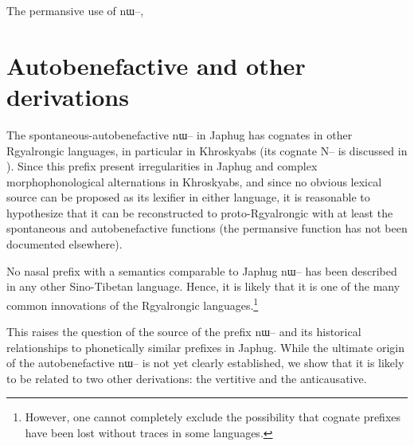 \documentclass[oldfontcommands,oneside,a4paper,11pt]{article}
\newcommand{\ipa}[1]{{\phon \mbox{#1}}} %
\begin{document}
%

The permansive use of \ipa{nɯ--}, 





\section{Autobenefactive and other derivations}

The spontaneous-autobenefactive \ipa{nɯ--} in Japhug has cognates in other Rgyalrongic languages, in particular in Khroskyabs (its cognate \ipa{N--} is discussed in \citealt[157-160]{lai13affixale}). Since this prefix present irregularities in Japhug and complex morphophonological alternations in Khroskyabs, and since no obvious lexical source can be proposed as its lexifier in either language, it is reasonable to hypothesize that it can be reconstructed to proto-Rgyalrongic with at least the spontaneous and autobenefactive functions (the permansive function has not been documented elsewhere).


No nasal prefix with a semantics comparable to Japhug \ipa{nɯ--} has been described in any other Sino-Tibetan language. Hence, it is likely that it is one of the many common innovations of the Rgyalrongic languages.\footnote{However, one cannot completely exclude the possibility that cognate prefixes have been lost without traces in some languages.} 

This raises the question of the source of the prefix \ipa{nɯ--} and its historical relationships to phonetically similar prefixes in Japhug. While the ultimate origin of the autobenefactive \ipa{nɯ--} is not yet clearly established, we show that it is likely to be related to two other derivations: the vertitive and the anticausative.

\end{document}
